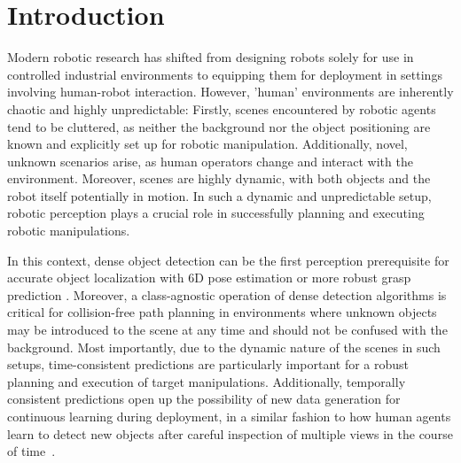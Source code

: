
\chapter{Introduction}\label{chapter:introduction}



Modern robotic research has shifted from designing robots solely for use in controlled industrial environments to equipping them for deployment in settings involving human-robot interaction.
However, 'human' environments are inherently chaotic and highly unpredictable: 
Firstly, scenes encountered by robotic agents tend to be cluttered, as neither the background nor the object positioning are known and explicitly set up for robotic manipulation. 
Additionally, novel, unknown scenarios arise, as human operators change and interact with the environment. 
Moreover, scenes are highly dynamic, with both objects and the robot itself potentially in motion. In such a dynamic and unpredictable setup, robotic perception plays a crucial role in successfully planning and executing robotic manipulations. \par

In this context, dense object detection can be the first perception prerequisite for accurate object localization with 6D pose estimation \parencite{augmentedAutoencoder} or more robust grasp prediction \parencite{graspnet}. 
Moreover, a class-agnostic operation of dense detection algorithms is critical for collision-free path planning in environments where unknown objects may be introduced to the scene at any time and should not be confused with the background. 
Most importantly, due to the dynamic nature of the scenes in such setups, time-consistent predictions are particularly important for a robust planning and execution of target manipulations. 
Additionally, temporally consistent predictions open up the possibility of new data generation for continuous learning during deployment, in a similar fashion to how human agents learn to detect new objects after careful inspection of multiple views in the course of time~\parencite{boerdijk2020selfsupervised}. \par


